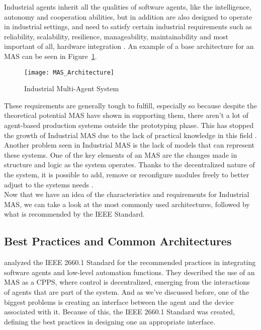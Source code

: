 Industrial agents inherit all the qualities of software agents, like the intelligence, autonomy and cooperation abilities, but in addition are also designed to operate in industrial settings, and need to satisfy certain industrial requirements such as reliability, scalability, resilience, manageability, maintainability and most important of all, hardware integration \cite{Leitao2021}. An example of a base architecture for an \gls{MAS} can be seen in Figure~\ref{fig:MAS_Architecture}. \\

\begin{figure}[h!]
	\centering
	\texttt{[image: MAS\_Architecture]}
	\caption{Industrial Multi-Agent System}
	\label{fig:MAS_Architecture}
\end{figure}

These requirements are generally tough to fulfill, especially so because despite the theoretical potential \gls{MAS} have shown in supporting them, there aren't a lot of agent-based production systems outside the prototyping phase. This has stopped the growth of Industrial \gls{MAS} due to the lack of practical knowledge in this field \cite{Karnouskos2019}. Another problem seen in Industrial \gls{MAS} is the lack of models that can represent these systems. One of the key elements of an \gls{MAS} are the changes made in structure and logic as the system operates. Thanks to the decentralized nature of the system, it is possible to add, remove or reconfigure modules freely to better adjust to the systems needs \cite{Karnouskos2019}.\\

Now that we have an idea of the characteristics and requirements for Industrial \gls{MAS}, we can take a look at the most commonly used architectures, followed by what is recommended by the IEEE Standard.

\subsection{Best Practices and Common Architectures}
\label{subsec:best_practices_and_common_architectures}

\citeauthor{Leitao2021} \cite{Leitao2021} analyzed the IEEE 2660.1 Standard for the recommended practices in integrating software agents and low-level automation functions. They described the use of an MAS as a CPPS, where control is decentralized, emerging from the interactions of agents that are part of the system. And as we've discussed before, one of the biggest problems is creating an interface between the agent and the device associated with it. Because of this, the IEEE 2660.1 Standard was created, defining the best practices in designing one an appropriate interface.\\

